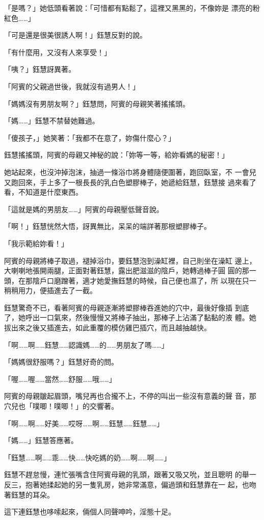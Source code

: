 「是嗎？」她低頭看著說：「可惜都有點鬆了，這裡又黑黑的，不像妳是
漂亮的粉紅色……」

「可是還是很美很誘人啊！」鈺慧反對的說。

「有什麼用，又沒有人來享受！」

「咦？」鈺慧訝異著。

「阿賓的父親過世後，我就沒有過男人！」

「媽媽沒有男朋友啊？」鈺慧問，阿賓的母親笑著搖搖頭。

「媽……」鈺慧不禁替她難過。

「傻孩子，」她笑著：「我都不在意了，妳傷什麼心？」

鈺慧搖搖頭，阿賓的母親又神秘的說：「妳等一等，給妳看媽的秘密！」

她站起來，也沒沖掉泡沫，抽過一條浴巾將身體隨便圍著，跑回臥室，不
一會兒又跑回來，手上多了一根長長的乳白色塑膠棒子，她遞給鈺慧，鈺慧接
過來看了看，不知道是什麼東西。

「這就是媽的男朋友……」阿賓的母親壓低聲音說。

「啊！」鈺慧恍然大悟，訝異無比，呆呆的端詳著那根塑膠棒子。

「我示範給妳看！」

阿賓的母親將棒子取過，褪掉浴巾，要鈺慧泡到澡缸裡，自己則坐在澡缸
邊上，大喇喇地張開兩腿，正面對著鈺慧，露出肥滋滋的陰戶，她轉過棒子圓
圓的那一頭，在那陰戶口磨蹭著，適才她愛撫鈺慧的時候，自己便也濕了，所
以現在只一稍稍用力，便插進去了一截。

鈺慧驚奇不已，看著阿賓的母親逐漸將塑膠棒吞進她的穴中，最後好像插
到底了，她呼出一口氣來，然後慢慢又將棒子抽出，那棒子上沾滿了黏黏的液
體。她拔出來之後又插進去，如此重覆的模仿雞巴插穴，而且越抽越快。

「啊……啊……鈺慧……認識媽……的……男朋友了嗎……」

「媽媽很舒服嗎？」鈺慧好奇的問。

「喔……喔……當然……舒服……哦……」

阿賓的母親皺起眉頭，嘴兒再也合攏不上，不停的叫出一些沒有意義的聲
音，那穴兒也「噗唧！噗唧！」的交響著。

「啊……啊……好美……哎呀……啊……鈺慧……鈺慧……」

「媽……」鈺慧答應著。

「鈺慧……啊……乖……快……快吃媽的奶……啊……啊……」

鈺慧不趕怠慢，連忙張嘴含住阿賓母親的乳頭，跟著又吸又吮，並且聰明
的舉一反三，抱著她揉起她的另一隻乳房，她非常滿意，偏過頭和鈺慧靠在一
起，也吻著鈺慧的耳朵。

這下連鈺慧也哆嗦起來，倆個人同聲呻吟，淫態十足。

